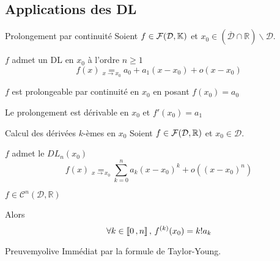 \subsection{Applications des DL}

    \begin{prop}{Prolongement par continuité}{}
        Soient $f \in \mathcal{F}(\mathcal{D},\mathbb{K})$ et $x_0 \in (\overline{\mathcal{D}} \cap \mathbb{R})\backslash \mathcal{D}$.

        \begin{suppose}
            \item $f$ admet un DL en $x_0$ à l’ordre $n \geq 1$ 
            \[ f(x) \underset{x\rightarrow x_0}{=} a_0 + a_1(x-x_0) + o(x-x_0) \]
        \end{suppose}
        \begin{alors}
            \item $f$ est prolongeable par continuité en $x_0$ en posant $f(x_0) = a_0$
            \item Le prolongement est dérivable en $x_0$ et $f'(x_0) = a_1$
        \end{alors}
    \end{prop}

    \begin{prop}{Calcul des dérivées $k$-èmes en $x_0$}{}
        Soient $f \in \mathcal{F}(\mathcal{D},\mathbb{R})$ et $x_0 \in \mathcal{D}$.

        \begin{suppose}
            \item $f$ admet le $DL_n(x_0)$ 
            \[ f(x) \underset{x \rightarrow x_0}{=} \sum\limits_{k=0}^n a_k (x - x_0)^k + o\left((x-x_0)^n\right) \]
            \item $f \in \mathcal{C}^n(\mathcal{D},\mathbb{R})$
        \end{suppose}
        Alors 
        \[ \forall k \in \left\llbracket 0 \, , n \right\rrbracket, \, f^{(k)}(x_0) = k!a_k \]
    \end{prop}

    \begin{demo}{Preuve}{myolive}
        Immédiat par la formule de Taylor-Young.
    \end{demo}

